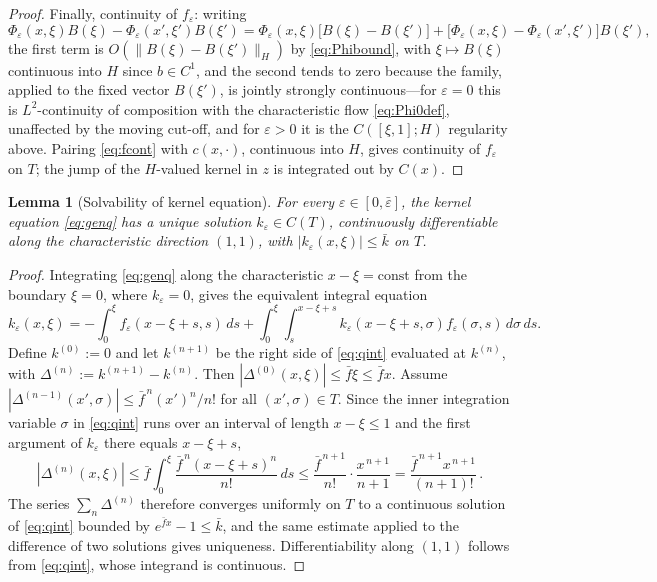 \documentclass[12pt]{article}
\theoremstyle{plain}
\newtheorem{lemma}{Lemma}
\theoremstyle{remark}
\newcommand{\Hs}{H}
\begin{document}
\begin{proof}
Finally, continuity of $f_\varepsilon$: writing
\begin{equation}
 \Phi_\varepsilon(x,\xi)B(\xi)-\Phi_\varepsilon(x',\xi')B(\xi')
 =\Phi_\varepsilon(x,\xi)\big[B(\xi)-B(\xi')\big]
 +\big[\Phi_\varepsilon(x,\xi)-\Phi_\varepsilon(x',\xi')\big]B(\xi'),
 \label{eq:fcont}
\end{equation}
the first term is $O(\|B(\xi)-B(\xi')\|_\Hs)$ by \eqref{eq:Phibound}, with $\xi\mapsto B(\xi)$ continuous into $\Hs$ since $b\in C^1$, and the second tends to zero because the family, applied to the fixed vector $B(\xi')$, is jointly strongly continuous---for $\varepsilon=0$ this is $L^2$-continuity of composition with the characteristic flow \eqref{eq:Phi0def}, unaffected by the moving cut-off, and for $\varepsilon>0$ it is the $C([\xi,1];\Hs)$ regularity above. Pairing \eqref{eq:fcont} with $c(x,\cdot)$, continuous into $\Hs$, gives continuity of $f_\varepsilon$ on $T$; the jump of the $\Hs$-valued kernel in $z$ is integrated out by $C(x)$.
\end{proof}

\begin{lemma}[Solvability of kernel equation]\label{lem:kernel}
For every $\varepsilon\in[0,\bar\varepsilon]$, the kernel equation \eqref{eq:genq} has a unique solution $k_\varepsilon\in C(T)$, continuously differentiable along the characteristic direction $(1,1)$, with $|k_\varepsilon(x,\xi)|\le\bar k$ on $T$.
\end{lemma}

\begin{proof}
Integrating \eqref{eq:genq} along the characteristic $x-\xi=\mathrm{const}$ from the boundary $\xi=0$, where $k_\varepsilon=0$, gives the equivalent integral equation
\begin{equation}
 k_\varepsilon(x,\xi)
 =-\int_0^\xi f_\varepsilon(x-\xi+s,s)\,ds
 +\int_0^\xi\!\int_s^{x-\xi+s}k_\varepsilon(x-\xi+s,\sigma)f_\varepsilon(\sigma,s)\,d\sigma\,ds .
 \label{eq:qint}
\end{equation}
Define $k^{(0)}:=0$ and let $k^{(n+1)}$ be the right side of \eqref{eq:qint} evaluated at $k^{(n)}$, with $\Delta^{(n)}:=k^{(n+1)}-k^{(n)}$. Then $|\Delta^{(0)}(x,\xi)|\le\bar f\xi\le\bar fx$. Assume $|\Delta^{(n-1)}(x',\sigma)|\le\bar f^{\,n}(x')^{n}/n!$ for all $(x',\sigma)\in T$. Since the inner integration variable $\sigma$ in \eqref{eq:qint} runs over an interval of length $x-\xi\le1$ and the first argument of $k_\varepsilon$ there equals $x-\xi+s$,
\begin{equation}
 |\Delta^{(n)}(x,\xi)|
 \le\bar f\int_0^\xi\frac{\bar f^{\,n}(x-\xi+s)^{n}}{n!}\,ds
 \le\frac{\bar f^{\,n+1}}{n!}\cdot\frac{x^{\,n+1}}{n+1}
 =\frac{\bar f^{\,n+1}x^{\,n+1}}{(n+1)!}\,.
 \label{eq:qinduction}
\end{equation}
The series $\sum_n\Delta^{(n)}$ therefore converges uniformly on $T$ to a continuous solution of \eqref{eq:qint} bounded by $e^{\bar fx}-1\le\bar k$, and the same estimate applied to the difference of two solutions gives uniqueness. Differentiability along $(1,1)$ follows from \eqref{eq:qint}, whose integrand is continuous.
\end{proof}
\end{document}
